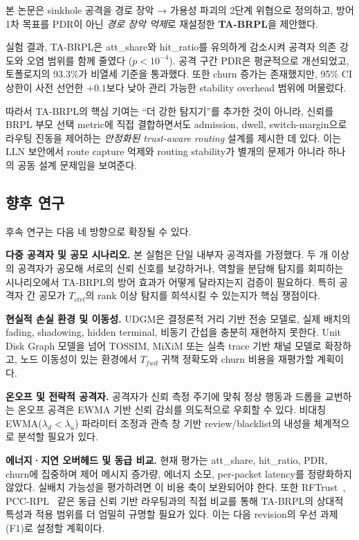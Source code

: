 \documentclass[10pt,a4paper,twocolumn]{article}
\begin{document}
본 논문은 sinkhole 공격을 경로 장악 → 가용성 파괴의 2단계 위협으로 정의하고,
방어 1차 목표를 PDR이 아닌 \emph{경로 장악 억제}로 재설정한 \textbf{TA-BRPL}을 제안했다.

실험 결과, TA-BRPL은 att\_share와 hit\_ratio를 유의하게 감소시켜
공격자 의존 강도와 오염 범위를 함께 줄였다 ($p<10^{-4}$).
공격 구간 PDR은 평균적으로 개선되었고,
토폴로지의 93.3\%가 비열세 기준을 통과했다.
또한 churn 증가는 존재했지만,
95\% CI 상한이 사전 선언한 $+0.1$보다 낮아
관리 가능한 stability overhead 범위에 머물렀다.

따라서 TA-BRPL의 핵심 기여는 ``더 강한 탐지기''를 추가한 것이 아니라,
신뢰를 BRPL 부모 선택 metric에 직접 결합하면서도
admission, dwell, switch-margin으로 라우팅 진동을 제어하는
\emph{안정화된 trust-aware routing} 설계를 제시한 데 있다.
이는 LLN 보안에서 route capture 억제와 routing stability가
별개의 문제가 아니라 하나의 공동 설계 문제임을 보여준다.

\subsection*{향후 연구}

후속 연구는 다음 네 방향으로 확장될 수 있다.

\textbf{다중 공격자 및 공모 시나리오.}
본 실험은 단일 내부자 공격자를 가정했다.
두 개 이상의 공격자가 공모해 서로의 신뢰 신호를 보강하거나,
역할을 분담해 탐지를 회피하는 시나리오에서
TA-BRPL의 방어 효과가 어떻게 달라지는지 검증이 필요하다.
특히 공격자 간 공모가 $T_{ctrl}$의 rank 이상 탐지를 희석시킬 수 있는지가 핵심 쟁점이다.

\textbf{현실적 손실 환경 및 이동성.}
UDGM은 결정론적 거리 기반 전송 모델로,
실제 배치의 fading, shadowing, hidden terminal, 비동기 간섭을 충분히 재현하지 못한다.
Unit Disk Graph 모델을 넘어 TOSSIM, MiXiM 또는 실측 trace 기반 채널 모델로 확장하고,
노드 이동성이 있는 환경에서 $T_{fwd}$ 귀책 정확도와 churn 비용을 재평가할 계획이다.

\textbf{온오프 및 전략적 공격자.}
공격자가 신뢰 측정 주기에 맞춰 정상 행동과 드롭을 교번하는 온오프 공격은
EWMA 기반 신뢰 감쇠를 의도적으로 우회할 수 있다.
비대칭 EWMA($\lambda_d < \lambda_u$) 파라미터 조정과
관측 창 기반 review/blacklist의 내성을 체계적으로 분석할 필요가 있다.

\textbf{에너지·지연 오버헤드 및 동급 비교.}
현재 평가는 att\_share, hit\_ratio, PDR, churn에 집중하며
제어 메시지 증가량, 에너지 소모, per-packet latency를 정량화하지 않았다.
실배치 가능성을 평가하려면 이 비용 축이 보완되어야 한다.
또한 RFTrust~\cite{rftrust2021}, PCC-RPL~\cite{pccrpl2022} 같은
동급 신뢰 기반 라우팅과의 직접 비교를 통해
TA-BRPL의 상대적 특성과 적용 범위를 더 엄밀히 규명할 필요가 있다.
이는 다음 revision의 우선 과제(F1)로 설정할 계획이다.



\end{document}

